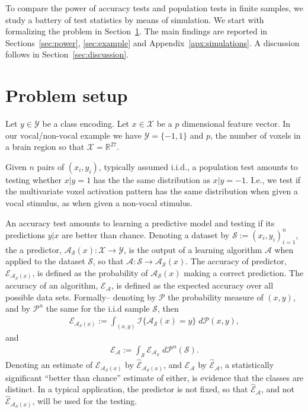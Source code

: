 \documentclass[12pt,a4paper]{article}
\theoremstyle{definition}
\newcommand{\set}[1]{\{ #1 \}} %
\newcommand{\indicator}[1]{\mathcal{I}{\set{#1}}} %
\newcommand{\reals}{\mathbb{R}} %
\newcommand{\features}{x} %
\newcommand{\outcomes}{y} %
\newcommand{\featureS}{\mathcal{X}} %
\newcommand{\outcomeS}{\mathcal{Y}} %
\newcommand{\acc}{\mathcal{E}}
\newcommand{\accEstim}{\hat{\mathcal{E}}}
\newcommand{\hyp}{\algo_{\data}(\features)} %
\newcommand{\algo}{\mathcal{A}}
\newcommand{\data}{\mathcal{S}}
\newcommand{\measure}{\mathcal{P}}
\newcommand{\measuren}{\measure^n}
\begin{document}
To compare the power of accuracy tests and population tests in finite samples, we study a battery of test statistics by means of simulation. 
We start with formalizing the problem in Section~\ref{sec:problem_setup}.
The main findings are reported in Sections~\ref{sec:power}, \ref{sec:example} and Appendix~\ref{apx:simulations}.
A discussion follows in Section~\ref{sec:discussion}. 



\section{Problem setup}
\label{sec:problem_setup}

Let $\outcomes \in \outcomeS$ be a class encoding. 
Let $\features \in \featureS$ be a $p$ dimensional feature vector. 
In our vocal/non-vocal example we have $\outcomeS=\set{-1,1}$ and $p$, the number of voxels in a brain region so that $\featureS=\reals^{27}$. 

Given $n$ pairs of $(\features_i,\outcomes_i)$, typically assumed i.i.d., a population test amounts to testing whether $\features|\outcomes=1$ has the the same distribution as $\features|\outcomes=-1$. 
I.e., we test if the multivariate voxel activation pattern has the same distribution when given a vocal stimulus, as when given a non-vocal stimulus. 

An accuracy test amounts to learning a predictive model and testing if its predictions $y|x$ are better than chance. 
Denoting a dataset by $\data:=(\features_i,\outcomes_i)_{i=1}^n$, the a predictor, $\hyp:\featureS \to \outcomeS$, is the output of a learning algorithm $\algo$ when applied to the dataset $\data$, so that $\algo:\data \to \hyp$. 
The accuracy of predictor, $\acc_{\hyp}$, is defined as the probability of $\hyp$ making a correct prediction.
The accuracy of an algorithm, $\acc_{\algo}$, is defined as the expected accuracy over all possible data sets. 
Formally-- denoting by $\measure$ the probability measure of $(\features, \outcomes)$, and by $\measuren$ the same for the i.i.d sample $\data$, then
\begin{align}
	\acc_{\hyp}:=\int_{(\features,\outcomes)} \indicator{\hyp=\outcomes} \; d\measure(\features,\outcomes),
\end{align}
and
\begin{align}
	\acc_{\algo}:=\int_\data \acc_{\algo_\data} \; d\measuren(\data).
\end{align}
Denoting an estimate of $\acc_{\hyp}$ by $\accEstim_{\hyp}$, and $\acc_{\algo}$ by $\accEstim_{\algo}$, 
a statistically significant ``better than chance'' estimate of either,  is evidence that the classes are distinct. 
In a typical application, the predictor is not fixed, so that $\accEstim_{\algo}$, and not $\accEstim_{\hyp}$, will be used for the testing. 
\end{document}
